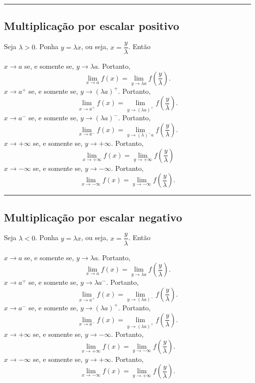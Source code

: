 \hrule

\subsection*{Multiplicação por escalar positivo}

Seja $\lambda>0$. Ponha $y=\lambda x$, ou seja, $x=\dfrac{y}{\lambda}$. Então

$x\to a$ se, e somente se, $y\to \lambda a$. Portanto,
\begin{equation*}\lim_{x\to a}f(x)=\lim_{y\to \lambda a}f\left(\frac{y}{\lambda}\right).\end{equation*}
$x\to a^+$ se, e somente se, $y\to (\lambda a)^+$. Portanto,
\begin{equation*}\lim_{x\to a^+}f(x)=\lim_{y\to(\lambda a)^+}f\left(\frac{y}{\lambda}\right).\end{equation*}
$x\to a^-$ se, e somente se, $y\to(\lambda a)^-$. Portanto,
\begin{equation*}\lim_{x\to a^-}f(x)=\lim_{y\to(\lambda)^- a}f\left(\frac{y}{\lambda}\right).\end{equation*}
$x\to+\infty$ se, e somente se, $y\to+\infty$. Portanto,
\begin{equation*}\lim_{x\to+\infty}f(x)=\lim_{y\to+\infty}f\left(\frac{y}{\lambda}\right)\end{equation*}
$x\to-\infty$ se, e somente se, $y\to-\infty$. Portanto,
\begin{equation*}\lim_{x\to-\infty} f(x)=\lim_{y\to -\infty}f\left(\frac{y}{\lambda}\right).\end{equation*}

\hrule

\subsection*{Multiplicação por escalar negativo}

Seja $\lambda<0$. Ponha $y=\lambda x$, ou seja, $x=\dfrac{y}{\lambda}$. Então

$x\to a$ se, e somente se, $y\to \lambda a$. Portanto,
\begin{equation*}\lim_{x\to a}f(x)=\lim_{y\to \lambda a}f\left(\frac{y}{\lambda}\right).\end{equation*}
$x\to a^+$ se, e somente se, $y\to \lambda a^-$. Portanto,
\begin{equation*}\lim_{x\to a^+}f(x)=\lim_{y\to(\lambda a)^-}f\left(\frac{y}{\lambda}\right).\end{equation*}
$x\to a^-$ se, e somente se, $y\to(\lambda a)^+$. Portanto,
\begin{equation*}\lim_{x\to a^-}f(x)=\lim_{y\to(\lambda a)^+}f\left(\frac{y}{\lambda}\right).\end{equation*}
$x\to+\infty$ se, e somente se, $y\to-\infty$. Portanto,
\begin{equation*}\lim_{x\to+\infty} f(x)=\lim_{y\to -\infty}f\left(\frac{y}{\lambda}\right).\end{equation*}
$x\to-\infty$ se, e somente se, $y\to+\infty$. Portanto,
\begin{equation*}\lim_{x\to-\infty} f(x)=\lim_{y\to +\infty}f\left(\frac{y}{\lambda}\right).\end{equation*}

